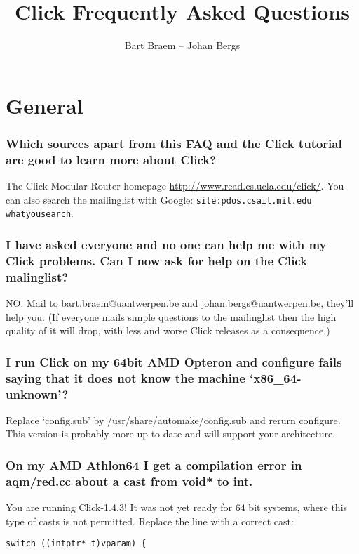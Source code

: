 \documentclass[a4paper]{article}
\author{Bart Braem -- Johan Bergs}
\title{Click Frequently Asked Questions}
\date{}
\begin{document}
\maketitle
\tableofcontents

\section{General} %
\label{sec:general}

\subsubsection*{Which sources apart from this FAQ and the Click tutorial are good to learn more about Click?} %
The Click Modular Router homepage \url{http://www.read.cs.ucla.edu/click/}. You can  also search the mailinglist with Google: \texttt{site:pdos.csail.mit.edu whatyousearch}.


\subsubsection*{I have asked everyone and no one can help me with my Click problems. Can
I now ask for help on the Click malinglist?}

NO. Mail to bart.braem@uantwerpen.be and johan.bergs@uantwerpen.be, they'll
help you. (If everyone mails simple questions to the mailinglist then
the high quality of it will drop, with less and worse Click releases as
a consequence.)

\subsubsection*{I run Click on my 64bit AMD Opteron and configure fails saying that it
does not know the machine `x86\_64-unknown'?}

Replace `config.sub' by /usr/share/automake/config.sub and rerurn
configure. This version is probably more up to date and will support
your architecture.

\subsubsection*{On my AMD Athlon64 I get a compilation error in aqm/red.cc about a cast
from void* to int.}

You are running Click-1.4.3! It was not yet ready for 64 bit systems,
where this type of casts is not permitted. Replace the line with a
correct cast:
\begin{lstlisting}
switch ((intptr* t)vparam) {
\end{lstlisting}
\end{document}

